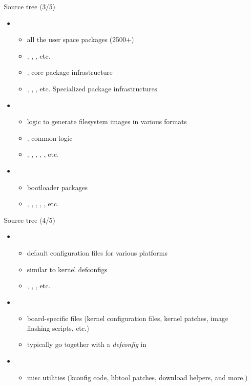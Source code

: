 \begin{frame}{Source tree (3/5)}
  \begin{itemize}
  \item {}
    \begin{itemize}
    \item all the user space packages (2500+)
    \item {}, , , etc.
    \item {}, core package infrastructure
    \item {}, ,
      , etc. Specialized package infrastructures
    \end{itemize}
  \item {}
    \begin{itemize}
    \item logic to generate filesystem images in various formats
    \item {}, common logic
    \item {}, , , ,
      , etc.
    \end{itemize}
  \item {}
    \begin{itemize}
    \item bootloader packages
    \item {}, , ,
      , , etc.
    \end{itemize}
  \end{itemize}
\end{frame}

\begin{frame}{Source tree (4/5)}
  \begin{itemize}
  \item {}
    \begin{itemize}
    \item default configuration files for various platforms
    \item similar to kernel defconfigs
    \item {},
      , , etc.
    \end{itemize}
  \item {}
    \begin{itemize}
    \item board-specific files (kernel configuration files, kernel
      patches, image flashing scripts, etc.)
    \item typically go together with a {\em defconfig} in
    \end{itemize}
  \item {}
    \begin{itemize}
    \item misc utilities (kconfig code, libtool patches, download
      helpers, and more.)
    \end{itemize}
  \end{itemize}
\end{frame}

